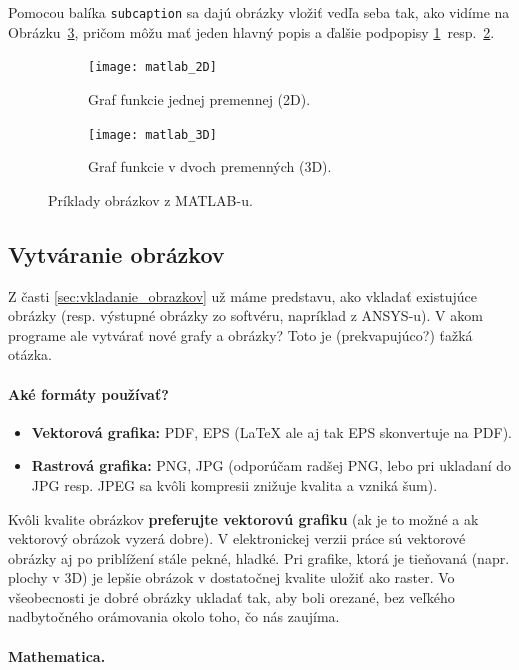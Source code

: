 Pomocou balíka \verb|subcaption| sa dajú obrázky vložiť vedľa seba tak, ako vidíme na Obrázku~\ref{fig:matlab}, pričom môžu mať jeden hlavný popis a ďalšie podpopisy \ref{fig:matlab_2D}~resp.~\ref{fig:matlab_3D}.
\begin{figure}[!h]
	\centering
	\begin{subfigure}[b]{0.45\linewidth}
		\texttt{[image: matlab\_2D]}
		\caption{Graf funkcie jednej premennej (2D).}
		\label{fig:matlab_2D}
	\end{subfigure}
	\qquad
	\begin{subfigure}[b]{0.45\linewidth}
		\texttt{[image: matlab\_3D]}
		\caption{Graf funkcie v dvoch premenných (3D).}
		\label{fig:matlab_3D}
	\end{subfigure}
	\caption{Príklady obrázkov z MATLAB-u.}\label{fig:matlab}
\end{figure}


\subsection{Vytváranie obrázkov}

Z časti \ref{sec:vkladanie_obrazkov} už máme predstavu, ako vkladať existujúce obrázky (resp. výstupné obrázky zo softvéru, napríklad z ANSYS-u). V akom programe ale vytvárať nové grafy a obrázky? Toto je (prekvapujúco?) ťažká otázka.

\paragraph{Aké formáty používať?}

\begin{itemize}
	\item \textbf{Vektorová grafika:} PDF, EPS (LaTeX ale aj tak EPS skonvertuje na PDF).
	\item \textbf{Rastrová grafika:} PNG, JPG (odporúčam radšej PNG, lebo pri ukladaní do JPG resp. JPEG sa kvôli kompresii znižuje kvalita a vzniká šum).
\end{itemize}
Kvôli kvalite obrázkov \textbf{preferujte vektorovú grafiku} (ak je to možné a ak vektorový obrázok vyzerá dobre). V elektronickej verzii práce sú vektorové obrázky aj po priblížení stále pekné, hladké. Pri grafike, ktorá je tieňovaná (napr. plochy v 3D) je lepšie obrázok v dostatočnej kvalite uložiť ako raster. Vo všeobecnosti je dobré obrázky ukladať tak, aby boli orezané, bez veľkého nadbytočného orámovania okolo toho, čo nás zaujíma.


\paragraph{Mathematica.}

